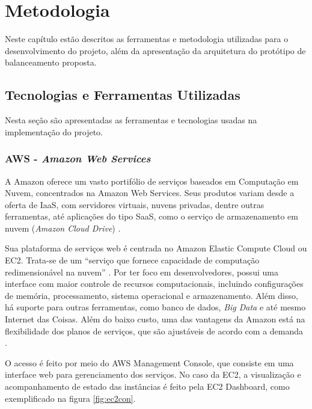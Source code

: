 \chapter{Metodologia}\label{cap:metodologia}
Neste capítulo estão descritos as ferramentas e metodologia utilizadas para o desenvolvimento do projeto, além da apresentação da arquitetura do protótipo de balanceamento proposta. 

\section{Tecnologias e Ferramentas Utilizadas}\label{sec:tecnologias-ferramentas}
Nesta seção são apresentadas as ferramentas e tecnologias usadas na implementação do projeto. 

\subsection{AWS - \textit{Amazon Web Services}}\label{sec:aws}
A Amazon oferece um vasto portifólio de serviços baseados em Computação em Nuvem, concentrados na Amazon Web Services. Seus produtos variam desde a oferta de IaaS, com servidores virtuais, nuvens privadas, dentre outras ferramentas, até aplicações do tipo SaaS, como o serviço de armazenamento em nuvem (\textit{Amazon Cloud Drive}) \cite{AmazonCloudDrive}.

Sua plataforma de serviços web é centrada no Amazon Elastic Compute Cloud ou EC2. Trata-se de um “serviço que fornece capacidade de computação redimensionável na nuvem” \cite{AmazonEC2}. Por ter foco em desenvolvedores, possui uma interface com maior controle de recursos computacionais, incluindo configurações de memória, processamento, sistema operacional e armazenamento. Além disso, há suporte para outras ferramentas, como banco de dados, \textit{Big Data} e até mesmo Internet das Coisas. Além do baixo custo, uma das vantagens da Amazon está na flexibilidade dos planos de serviços, que são ajustáveis de acordo com a demanda \cite{AmazonEC2price}.

O acesso é feito por meio do AWS Management Console, que consiste em uma interface web para gerenciamento dos serviços. No caso da EC2, a visualização e acompanhamento de estado das instâncias é feito pela EC2 Dashboard, como exemplificado na figura \ref{fig:ec2con}. 

